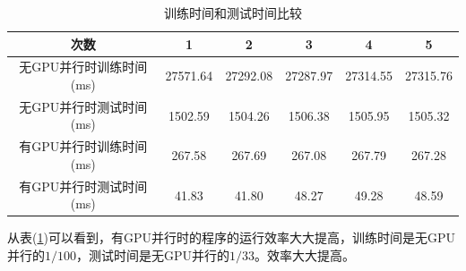 \documentclass[UTF-8, a4paper, 12pt]{ctexart}
\begin{document}
\begin{table}[htbp]
    \centering
    \caption{训练时间和测试时间比较}
    \label{train_time}
    \begin{tabular}{c|ccccc}
        \hline
        次数&1&2&3&4&5\\%
        \hline
        无GPU并行时训练时间(ms)&27571.64&27292.08&27287.97&27314.55&27315.76\\
        无GPU并行时测试时间(ms)&1502.59&1504.26&1506.38&1505.95&1505.32\\
        \hline
        有GPU并行时训练时间(ms)&267.58&267.69&267.08&267.79&267.28\\
        有GPU并行时测试时间(ms)&41.83&41.80&48.27&49.28&48.59\\
        \hline
    \end{tabular}
\end{table}



从表(\ref{train_time})可以看到，有GPU并行时的程序的运行效率大大提高，训练时间是无GPU并行的$1/100$，测试时间是无GPU并行的$1/33$。效率大大提高。




\end{document}
